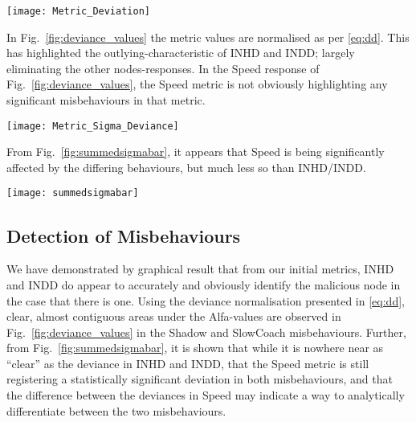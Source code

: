 \begin{figure*}
  \centering
  \texttt{[image: Metric\_Deviation]}
  \caption{\emph{Unnecessary but included for draft discussion} Observed Metric Values for one simulation of each behaviour ($d_{i,j}^{m,t}$ from Fig.~\ref{fig:workflow})}
\end{figure*}

In Fig.~\ref{fig:deviance_values} the metric values are normalised as per \eqref{eq:dd}.
This has highlighted the outlying-characteristic of INHD and INDD; largely eliminating the other nodes-responses.
In the Speed response of Fig.~\ref{fig:deviance_values}, the Speed metric is not obviously highlighting any significant misbehaviours in that metric. 

\begin{figure*}
  \centering
  \texttt{[image: Metric\_Sigma\_Deviance]}
  \caption{Normalised Deviance values from one simulation of each behaviour ($\alpha_{i,j}^{m,t}$ from \eqref{eq:dd})}
  \label{fig:deviance_values}
\end{figure*}

From Fig.~\ref{fig:summedsigmabar}, it appears that Speed is being significantly affected by the differing behaviours, but much less so than INHD/INDD.  

\begin{figure*}
  \centering
  \texttt{[image: summedsigmabar]}
  \caption{Per-Node-Per-Run deviance for each metric, normalised in time ($\sum\alpha/T$)}
  \label{fig:summedsigmabar}
\end{figure*}

\subsection{Detection of Misbehaviours}
We have demonstrated by graphical result that from our initial metrics, INHD and INDD do appear to accurately and obviously identify the malicious node in the case that there is one. 
Using the deviance normalisation presented in \eqref{eq:dd}, clear, almost contiguous areas under the Alfa-values are observed in Fig.~\ref{fig:deviance_values} in the Shadow and SlowCoach misbehaviours.
Further, from Fig.~\ref{fig:summedsigmabar}, it is shown that while it is nowhere near as ``clear'' as the deviance in INHD and INDD, that the Speed metric is still registering a statistically significant deviation in both misbehaviours, and that the difference between the deviances in Speed may indicate a way to analytically differentiate between the two misbehaviours.

